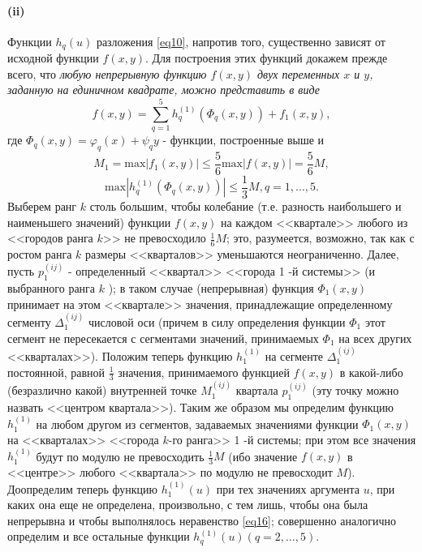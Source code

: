 \documentclass[12pt, twoside]{article}
\theoremstyle{definition}
\begin{document}
\paragraph{(ii)} Функции $h_q(u)$ разложения \eqref{eq10}, напротив того, существенно зависят от исходной функции $f(x,y)$. Для построения этих функций докажем прежде всего, что \textit{любую непрерывную функцию  $f(x,y)$ двух переменных $x$ и $y$, заданную на единичном квадрате, можно представить в виде}
\begin{equation}\label{eq14}
f(x,y) = \sum\limits_{q=1}^{5}h_q^{(1)}(\Phi_q(x,y))+f_{1}(x,y),
\end{equation}
где $\Phi_q(x,y) = \varphi_q(x)+\psi_{q}y$ - функции, построенные выше и  
\begin{equation}\label{eq15}
M_1=\text{max}|f_{1}(x,y)|\leq\frac{5}{6}\text{max}|f(x,y)|=\frac{5}{6}M,
\end{equation}
\begin{equation}\label{eq16}
\text{max}|h_{q}^{(1)}(\Phi_q(x,y))|\leq\frac{1}{3}M, q = 1,\dots,5.
\end{equation}
Выберем ранг $k$ столь большим, чтобы колебание (т.е. разность наибольшего и наименьшего значений) функции $f(x,y)$ на каждом <<квартале>> любого из <<городов ранга $k$>> не превосходило ${\frac{1}{6}}M$; это, разумеется, возможно, так как с ростом ранга $k$ размеры <<кварталов>> уменьшаются неограниченно. Далее, пусть $p_1^{(ij)}$ - определенный <<квартал>> <<города 1 -й системы>> (и выбранного ранга $k$ ); в таком случае (непрерывная) функция $\Phi_1(x,y)$ принимает на этом <<квартале>> значения, принадлежащие определенному сегменту $\Delta_1^{(ij)}$ числовой оси (причем в силу определения функции $\Phi_1$ этот сегмент не пересекается с сегментами значений, принимаемых $\Phi_1$ на всех других <<кварталах>>). Положим теперь функцию $h_1^{(1)}$ на сегменте $\Delta_1^{(ij)}$ постоянной, равной $\frac{1}{3}$ значения, принимаемого функцией $f(x,y)$ в какой-либо (безразлично какой) внутренней точке $M_1^{(ij)}$ квартала $p_1^{(ij)}$ (эту точку можно назвать <<центром квартала>>). Таким же образом мы определим функцию $h_1^{(1)}$ на любом другом из сегментов, задаваемых значениями функции $\Phi_1(x,y)$ на <<кварталах>> <<города $k$-го ранга>> 1 -й системы; при этом все значения $h_1^{(1)}$ будут по модулю не превосходить ${\frac{1}{3}}M$ (ибо значение $f(x,y)$ в <<центре>> любого <<квартала>> по модулю не превосходит $M$). Доопределим теперь функцию $h_1^{(1)}(u)$ при тех значениях аргумента $u$, при каких она еще не определена, произвольно, с тем лишь, чтобы она была непрерывна и чтобы выполнялось неравенство \eqref{eq16}; совершенно аналогично определим и все остальные функции  $h_q^{(1)}(u) (q=2,\dots,5 )$.
\end{document}
